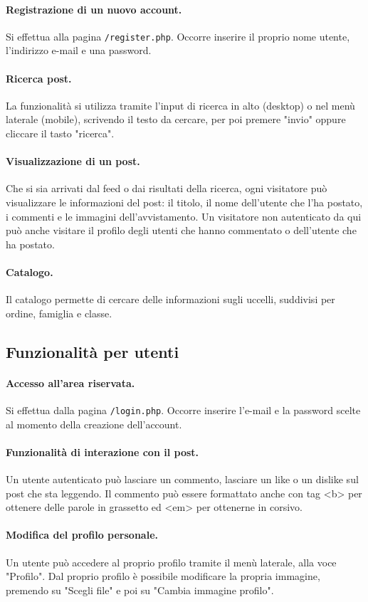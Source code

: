 \documentclass[12pt, a4paper]{article}
\begin{document}
\paragraph{Registrazione di un nuovo account.} Si effettua alla pagina \texttt{/register.php}. Occorre inserire il proprio nome utente, l'indirizzo e-mail e una password.
\paragraph{Ricerca post.} La funzionalità si utilizza tramite l'input di ricerca in alto (desktop) o nel menù laterale (mobile), scrivendo il testo da cercare, per poi premere "invio" oppure cliccare il tasto "ricerca".  
\paragraph{Visualizzazione di un post.} Che si sia arrivati dal feed o dai risultati della ricerca, ogni visitatore può visualizzare le informazioni del post: il titolo, il nome dell'utente che l'ha postato, i commenti e le immagini dell'avvistamento. Un visitatore non autenticato da qui può anche visitare il profilo degli utenti che hanno commentato o dell'utente che ha postato.
\paragraph{Catalogo.} Il catalogo permette di cercare delle informazioni sugli uccelli, suddivisi per ordine, famiglia e classe.
\subsection{Funzionalità per utenti}
\paragraph{Accesso all'area riservata.} 
Si effettua dalla pagina \texttt{/login.php}. Occorre inserire l'e-mail e la password scelte al momento della creazione dell'account. 
\paragraph{Funzionalità di interazione con il post.} Un utente autenticato può lasciare un commento, lasciare un like o un dislike sul post che sta leggendo. Il commento può essere formattato anche con tag <b> per ottenere delle parole in grassetto ed <em> per ottenerne in corsivo.
\paragraph{Modifica del profilo personale.}
Un utente può accedere al proprio profilo tramite il menù laterale, alla voce "Profilo". Dal proprio profilo è possibile modificare la propria immagine, premendo su "Scegli file" e poi su "Cambia immagine profilo".
\end{document}
